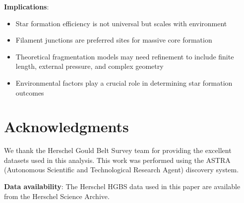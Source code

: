 \documentclass[11pt,a4paper]{article}
\begin{document}
\textbf{Implications}:
\begin{itemize}
    \item Star formation efficiency is not universal but scales with environment
    \item Filament junctions are preferred sites for massive core formation
    \item Theoretical fragmentation models may need refinement to include finite length, external pressure, and complex geometry
    \item Environmental factors play a crucial role in determining star formation outcomes
\end{itemize}

\section*{Acknowledgments}

We thank the Herschel Gould Belt Survey team for providing the excellent datasets used in this analysis. This work was performed using the ASTRA (Autonomous Scientific and Technological Research Agent) discovery system.

\textbf{Data availability}: The Herschel HGBS data used in this paper are available from the Herschel Science Archive.
\end{document}
